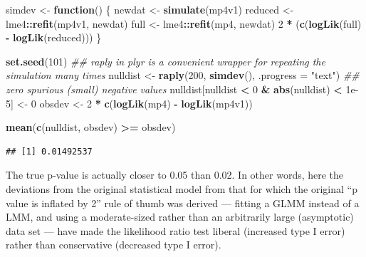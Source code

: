 \documentclass[
  12pt,
]{book}
\newenvironment{Shaded}{\begin{snugshade}}{\end{snugshade}}
\newcommand{\CommentTok}[1]{\textcolor[rgb]{0.56,0.35,0.01}{\textit{#1}}}
\newcommand{\ControlFlowTok}[1]{\textcolor[rgb]{0.13,0.29,0.53}{\textbf{#1}}}
\newcommand{\DataTypeTok}[1]{\textcolor[rgb]{0.13,0.29,0.53}{#1}}
\newcommand{\DecValTok}[1]{\textcolor[rgb]{0.00,0.00,0.81}{#1}}
\newcommand{\FloatTok}[1]{\textcolor[rgb]{0.00,0.00,0.81}{#1}}
\newcommand{\KeywordTok}[1]{\textcolor[rgb]{0.13,0.29,0.53}{\textbf{#1}}}
\newcommand{\NormalTok}[1]{#1}
\newcommand{\OperatorTok}[1]{\textcolor[rgb]{0.81,0.36,0.00}{\textbf{#1}}}
\newcommand{\StringTok}[1]{\textcolor[rgb]{0.31,0.60,0.02}{#1}}
\begin{document}
\begin{Shaded}
\begin{Highlighting}[]
\NormalTok{simdev <-}\StringTok{ }\ControlFlowTok{function}\NormalTok{() \{}
\NormalTok{  newdat <-}\StringTok{ }\KeywordTok{simulate}\NormalTok{(mp4v1)}
\NormalTok{  reduced <-}\StringTok{ }\NormalTok{lme4}\OperatorTok{::}\KeywordTok{refit}\NormalTok{(mp4v1, newdat)}
\NormalTok{  full <-}\StringTok{ }\NormalTok{lme4}\OperatorTok{::}\KeywordTok{refit}\NormalTok{(mp4, newdat)}
  \DecValTok{2} \OperatorTok{*}\StringTok{ }\NormalTok{(}\KeywordTok{c}\NormalTok{(}\KeywordTok{logLik}\NormalTok{(full) }\OperatorTok{-}\StringTok{ }\KeywordTok{logLik}\NormalTok{(reduced)))}
\NormalTok{\}}

\KeywordTok{set.seed}\NormalTok{(}\DecValTok{101}\NormalTok{)}
\CommentTok{## raply in plyr is a convenient wrapper for repeating the simulation many times}
\NormalTok{nulldist <-}\StringTok{ }\KeywordTok{raply}\NormalTok{(}\DecValTok{200}\NormalTok{, }\KeywordTok{simdev}\NormalTok{(), }\DataTypeTok{.progress =} \StringTok{"text"}\NormalTok{)}
\CommentTok{## zero spurious (small) negative values}
\NormalTok{nulldist[nulldist }\OperatorTok{<}\StringTok{ }\DecValTok{0} \OperatorTok{&}\StringTok{ }\KeywordTok{abs}\NormalTok{(nulldist) }\OperatorTok{<}\StringTok{ }\FloatTok{1e-5}\NormalTok{] <-}\StringTok{ }\DecValTok{0}
\NormalTok{obsdev <-}\StringTok{ }\DecValTok{2} \OperatorTok{*}\StringTok{ }\KeywordTok{c}\NormalTok{(}\KeywordTok{logLik}\NormalTok{(mp4) }\OperatorTok{-}\StringTok{ }\KeywordTok{logLik}\NormalTok{(mp4v1))}
\end{Highlighting}
\end{Shaded}

\begin{Shaded}
\begin{Highlighting}[]
\KeywordTok{mean}\NormalTok{(}\KeywordTok{c}\NormalTok{(nulldist, obsdev) }\OperatorTok{>=}\StringTok{ }\NormalTok{obsdev)}
\end{Highlighting}
\end{Shaded}

\begin{verbatim}
## [1] 0.01492537
\end{verbatim}

The true p-value is actually closer to 0.05 than 0.02. In other words, here the deviations from the original statistical model from that for which the original ``p value is inflated by 2'' rule of thumb was derived --- fitting a GLMM instead of a LMM, and using a moderate-sized rather than an arbitrarily large (asymptotic) data set --- have made the likelihood ratio test liberal (increased type I error) rather than conservative (decreased type I error).
\end{document}
